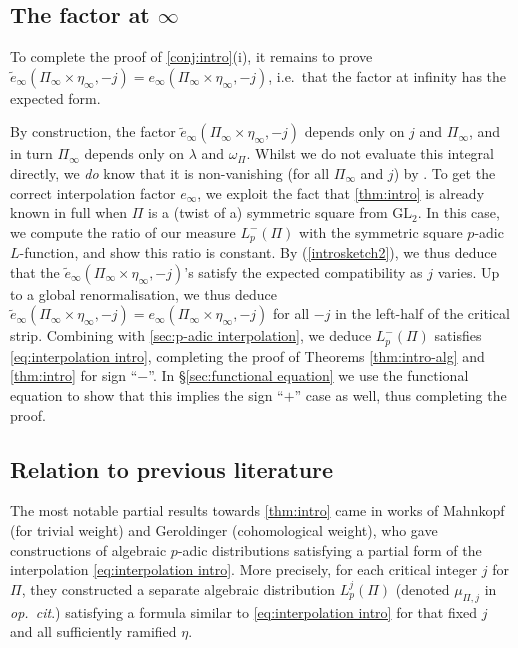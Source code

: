 \documentclass[10pt,reqno,a4paper]{amsart}
\newcommand{\GL}{\mathrm{GL}}
\begin{document}
\subsection{\texorpdfstring{The factor at $\infty$}{The factor at infinity}}\label{sec:intro alg}
To complete the proof of \cref{conj:intro}(i), it remains to prove $\widetilde{e}_\infty(\Pi_\infty \times \eta_\infty,-j) = e_\infty(\Pi_\infty \times \eta_\infty,-j)$, i.e.\ that the factor at infinity has the expected form.

By construction, the factor $\widetilde{e}_\infty(\Pi_\infty \times \eta_\infty,-j)$ depends only on $j$ and $\Pi_\infty$, and in turn $\Pi_\infty$ depends only on $\lambda$ and $\omega_\Pi$. Whilst we do not evaluate this integral directly, we \emph{do} know that it is non-vanishing (for all $\Pi_\infty$ and $j$) by \cite{KS13}. To get the correct interpolation factor $e_\infty$, we exploit the fact that \cref{thm:intro} is already known in full when $\Pi$ is a (twist of a) symmetric square from $\GL_2$. In this case, we compute the ratio of our measure $L_p^-(\Pi)$ with the symmetric square $p$-adic $L$-function, and show this ratio is constant. By (\ref{introsketch2}), we thus deduce that the $\widetilde{e}_\infty(\Pi_\infty \times \eta_\infty,-j)$'s satisfy the expected compatibility as $j$ varies. Up to a global renormalisation, we thus deduce $\widetilde{e}_\infty(\Pi_\infty \times \eta_\infty,-j) = e_\infty(\Pi_\infty \times \eta_\infty,-j)$ for all $-j$ in the left-half %
of the critical strip. Combining with \cref{sec:p-adic interpolation}, we deduce $L_p^-(\Pi)$ satisfies \eqref{eq:interpolation intro}, completing the proof of Theorems \ref{thm:intro-alg} and \ref{thm:intro} for sign ``$-$''. In \S\ref{sec:functional equation} we use the functional equation to show that this implies the sign ``$+$'' case as well, thus completing the proof.


\subsection{Relation to previous literature}\label{sec:literature}

The most notable partial results towards \cref{thm:intro} came in works of Mahnkopf \cite{Mah00} (for trivial weight) and Geroldinger \cite{Ger15} (cohomological weight), who gave constructions of algebraic $p$-adic distributions satisfying a partial form of the interpolation \eqref{eq:interpolation intro}. More precisely, for each critical integer $j$ for $\Pi$, they constructed a separate algebraic distribution $L_p^j(\Pi)$ (denoted $\mu_{\Pi,j}$ in \emph{op.\ cit}.) satisfying a formula similar to \eqref{eq:interpolation intro} for that fixed $j$ and all sufficiently ramified $\eta$.
\end{document}
